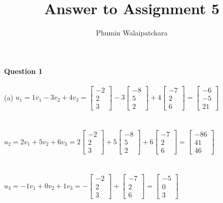 \documentclass{article}
\begin{document}
\title{Answer to Assignment 5}
\author{Phumin Walaipatchara}
\date{}
\maketitle
\noindent\textbf{Question 1}\\\\
\indent(a)\indent
\space$u_1 = 1v_1 - 3v_2 + 4v_3 = \begin{bmatrix}-2\\2\\3\end{bmatrix} - 3\begin{bmatrix}-8\\5\\2\end{bmatrix} + 4\begin{bmatrix}-7\\2\\6\end{bmatrix} = \begin{bmatrix}-6\\-5\\21\end{bmatrix}$
\\\\\\
\indent\indent\indent $u_2 = 2v_1 + 5v_2 + 6v_3 = 2\begin{bmatrix}-2\\2\\3\end{bmatrix} + 5\begin{bmatrix}-8\\5\\2\end{bmatrix} + 6\begin{bmatrix}-7\\2\\6\end{bmatrix} = \begin{bmatrix}-86\\41\\46\end{bmatrix}$
\\\\\\
\indent\indent\indent $u_3 = -1v_1 + 0v_2 + 1v_3 = -\begin{bmatrix}-2\\2\\3\end{bmatrix} + \begin{bmatrix}-7\\2\\6\end{bmatrix} = \begin{bmatrix}-5\\0\\3\end{bmatrix}$
\end{document}
